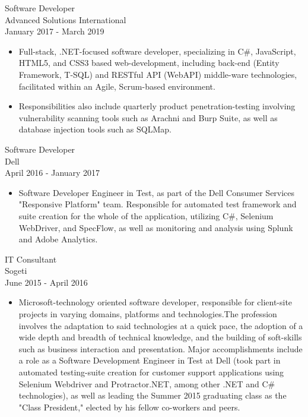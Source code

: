 \documentclass[11pt]{res} %
\begin{document}
\begin{resume}
Software Developer \\
Advanced Solutions International \\
January 2017 - March 2019
\vspace{0.2in}
   \begin{itemize} \itemsep -2pt  %
   \item Full-stack, .NET-focused software developer, specializing in C\#, JavaScript, HTML5, and CSS3 based web-development, including back-end (Entity Framework, T-SQL) and RESTful API (WebAPI) middle-ware technologies, facilitated within an Agile, Scrum-based environment.
\newline
    \item Responsibilities also include quarterly product penetration-testing involving vulnerability scanning tools such as Arachni and Burp Suite, as well as database injection tools such as SQLMap.
 \end{itemize}

 Software Developer \\
Dell \\
April 2016 - January 2017
\vspace{0.2in}
   \begin{itemize} \itemsep -2pt  %
   \item Software Developer Engineer in Test, as part of the Dell Consumer Services "Responsive Platform" team. Responsible for automated test framework and suite creation for the whole of the application, utilizing C\#, Selenium WebDriver, and SpecFlow, as well as monitoring and analysis using Splunk and Adobe Analytics.
 \end{itemize}
 
 
IT Consultant \\
Sogeti \\
June 2015 - April 2016
\vspace{0.2in}
   \begin{itemize} \itemsep -2pt  %
   \item Microsoft-technology oriented software developer, responsible for client-site projects in varying domains, platforms and technologies.The profession involves the adaptation to said technologies at a quick pace, the adoption of a wide depth and breadth of technical knowledge, and the building of soft-skills such as business interaction and presentation. Major accomplishments include a role as a Software Development Engineer in Test at Dell (took part in automated testing-suite creation for customer support applications using Selenium Webdriver and Protractor.NET, among other .NET and C\# technologies), as well as leading the Summer 2015 graduating class as the "Class President," elected by his fellow co-workers and peers.
 \end{itemize}


\end{resume}
\end{document}
